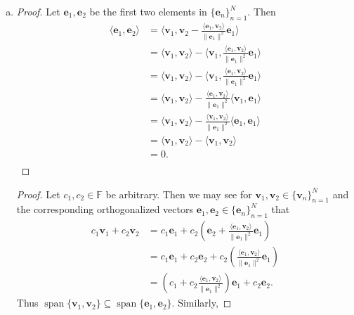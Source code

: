 \documentclass[12pt]{amsart}
\newcommand{\1}{\mathbbm{1}}
\numberwithin{equation}{section}
\numberwithin{Theorem}{section}
\theoremstyle{plain} %
\theoremstyle{definition}
\theoremstyle{remark}
\begin{document}
\begin{enumerate}[1.]
\begin{enumerate}[(a)]
	\item 
	\begin{proof}
		Let \(\mathbf{e}_1,\mathbf{e}_2\) be the first two elements in \(\{\mathbf{e}_{n}\}_{n=1}^{N}\). Then	
	\begin{align*}
		\langle \mathbf{e}_1,\mathbf{e}_2 \rangle
		&= \langle \mathbf{v}_1, \mathbf{v}_2 - \frac{\langle\mathbf{e}_1,\mathbf{v}_2\rangle}{\|\mathbf{e}_1\|^2}\mathbf{e}_1 \rangle  \\
		&= \langle \mathbf{v}_1, \mathbf{v}_2 \rangle - \langle \mathbf{v}_1, \frac{\langle\mathbf{e}_1,\mathbf{v}_2\rangle}{\|\mathbf{e}_1\|^2}\mathbf{e}_1 \rangle  \\
		&= \langle \mathbf{v}_1, \mathbf{v}_2 \rangle - \langle \mathbf{v}_1, \frac{\langle\mathbf{e}_1,\mathbf{v}_2\rangle}{\|\mathbf{e}_1\|^2}\mathbf{e}_1 \rangle  \\
		&= \langle \mathbf{v}_1, \mathbf{v}_2 \rangle - \frac{\langle\mathbf{e}_1,\mathbf{v}_2\rangle}{\|\mathbf{e}_1\|^2} \langle \mathbf{v}_1, \mathbf{e}_1 \rangle  \\
		&= \langle \mathbf{v}_1, \mathbf{v}_2 \rangle - \frac{\langle\mathbf{v}_1,\mathbf{v}_2\rangle}{\|\mathbf{e}_1\|^2} \langle \mathbf{e}_1, \mathbf{e}_1 \rangle  \\
		&= \langle \mathbf{v}_1, \mathbf{v}_2 \rangle - 
		\langle\mathbf{v}_1,\mathbf{v}_2\rangle   \\
		&= 0.  \\
	\end{align*}
	\end{proof}
	\begin{proof}
		Let \(c_1, c_2 \in\mathbb{F}\) be arbitrary. Then we may see for \(\mathbf{v}_1,\mathbf{v}_2 \in \{\mathbf{v}_{n}\}_{n=1}^{N}\) and the corresponding orthogonalized vectors \(\mathbf{e}_1,\mathbf{e}_2 \in\{\mathbf{e}_{n}\}_{n=1}^{N}\) that
		\begin{align*}
			c_1\mathbf{v}_1+c_2\mathbf{v}_2
			&= c_1\mathbf{e}_1+c_2\left( \mathbf{e}_2 + \frac{\langle\mathbf{e}_1,\mathbf{v}_2\rangle}{\|\mathbf{e}_1\|^2}\mathbf{e}_1 \right) \\
			&= c_1\mathbf{e}_1+ c_2\mathbf{e}_2 + c_2\left( \frac{\langle\mathbf{e}_1,\mathbf{v}_2\rangle}{\|\mathbf{e}_1\|^2}\mathbf{e}_1 \right) \\
			&= \left(c_1 + c_2 \frac{\langle\mathbf{e}_1,\mathbf{v}_2\rangle}{\|\mathbf{e}_1\|^2} \right)\mathbf{e}_1 + c_2\mathbf{e}_2.
		\end{align*}
		Thus \(\operatorname{span}\{\mathbf{v}_{1},\mathbf{v}_{2}\} \subseteq \operatorname{span}\{\mathbf{e}_{1},\mathbf{e}_{2}\}\). Similarly, 

\end{proof}
\end{enumerate}
\end{enumerate}
\end{document}
